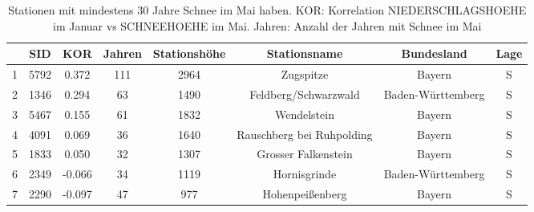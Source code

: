 \documentclass[11pt]{article}
\begin{document}
\begin{landscape}
\begin{table*}
\centering   
\caption{Stationen mit mindestens 30 Jahre Schnee im Mai haben. KOR: Korrelation NIEDERSCHLAGSHOEHE im Januar vs SCHNEEHOEHE im Mai. Jahren: Anzahl der Jahren mit Schnee im Mai \\} 
\label{tab:}  
\renewcommand{\arraystretch}{1.3}
 \begin{small}
\begin{tabular}{cccccccc}
  \toprule
 & \textbf{SID} & \textbf{KOR} & \textbf{Jahren} & \textbf{Stationsh\"ohe} & \textbf{Stationsname} & \textbf{Bundesland} & \textbf{Lage} \\ 
  \midrule
1 & 5792 & 0.372 & 111 & 2964 & Zugspitze & Bayern & S \\ 
  2 & 1346 & 0.294 & 63 & 1490 & Feldberg/Schwarzwald & Baden-Württemberg & S \\ 
  3 & 5467 & 0.155 & 61 & 1832 & Wendelstein & Bayern & S \\ 
  4 & 4091 & 0.069 & 36 & 1640 & Rauschberg bei Ruhpolding & Bayern & S \\ 
  5 & 1833 & 0.050 & 32 & 1307 & Grosser Falkenstein & Bayern & S \\ 
  6 & 2349 & -0.066 & 34 & 1119 & Hornisgrinde & Baden-Württemberg & S \\ 
  7 & 2290 & -0.097 & 47 & 977 & Hohenpeißenberg & Bayern & S \\ 
   \bottomrule
\end{tabular}
\end{small}
\end{table*}

\end{landscape}
\end{document}
